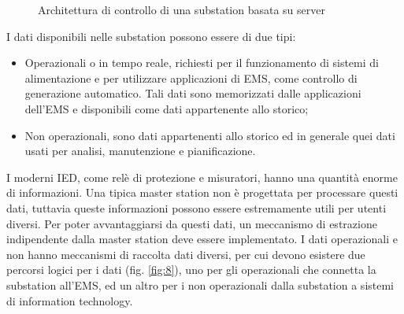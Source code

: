 \begin{figure}[h] 
\caption{Architettura di controllo di una substation basata su server}\label{fig:7}
\end{figure}

I dati disponibili nelle substation possono essere di due tipi:
\begin{itemize}
	\item Operazionali o in tempo reale, richiesti per il funzionamento di sistemi di alimentazione e per utilizzare applicazioni di EMS, come controllo di generazione automatico. Tali dati sono memorizzati dalle applicazioni dell'EMS e disponibili come dati appartenente allo storico;
	\item Non operazionali, sono dati appartenenti allo storico ed in generale quei dati usati per analisi, manutenzione e pianificazione. 
\end{itemize} 
I moderni IED, come relè di protezione e misuratori, hanno una quantità enorme di informazioni. Una tipica master station non è progettata per processare questi dati, tuttavia queste informazioni possono essere estremamente utili per utenti diversi. Per poter avvantaggiarsi da questi dati, un meccanismo di estrazione indipendente dalla master station deve essere implementato. I dati operazionali e non hanno meccanismi di raccolta dati diversi, per cui devono esistere due percorsi logici per i dati (fig. \ref{fig:8}), uno per gli operazionali che connetta la substation all'EMS, ed un altro per i non operazionali dalla substation a sistemi di information technology. 

